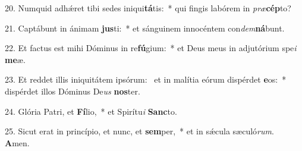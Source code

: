 20. Numquid adhǽret tibi sedes iniqui\textbf{tá}tis:~*  qui fingis labórem in \textit{præ}\textbf{cép}to?\

21. Captábunt in ánimam \textbf{jus}ti:~*  et sánguinem innocéntem con\textit{dem}\textbf{ná}bunt.\

22. Et factus est mihi Dóminus in re\textbf{fú}gium:~*  et Deus meus in adjutórium spe\textit{i} \textbf{me}æ.\

23. Et reddet illis iniquitátem ipsórum: \dag\  et in malítia eórum dispérdet \textbf{e}os:~*  dispérdet illos Dóminus De\textit{us} \textbf{nos}ter.\

24. Glória Patri, et \textbf{Fí}lio,~*  et Spirítu\textit{i} \textbf{Sanc}to.\

25. Sicut erat in princípio, et nunc, et \textbf{sem}per,~*  et in sǽcula sæculó\textit{rum}. \textbf{A}men.\

